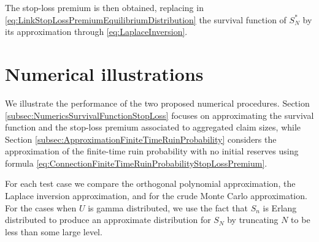 The stop-loss premium is then obtained, replacing in \eqref{eq:LinkStopLossPremiumEquilibriumDistribution} the survival function of $S_N^{\ast}$ by its approximation through \eqref{eq:LaplaceInversion}.
%

\section{Numerical illustrations}\label{sec:NumericalIllustrations}

We illustrate the performance of the two proposed numerical procedures. Section \ref{subsec:NumericsSurvivalFunctionStopLoss} focuses on approximating the survival function and the stop-loss premium associated to aggregated claim sizes, while Section \ref{subsec:ApproximationFiniteTimeRuinProbability} considers the approximation of the finite-time ruin probability with no initial reserves using formula \eqref{eq:ConnectionFiniteTimeRuinProbabilityStopLossPremium}.

For each test case we compare the orthogonal polynomial approximation, the Laplace inversion approximation, and for the crude Monte Carlo approximation. For the cases when $U$ is gamma distributed, we use the fact that $S_n$ is Erlang distributed to produce an approximate distribution for $S_N$ by truncating $N$ to be less than some large level.


